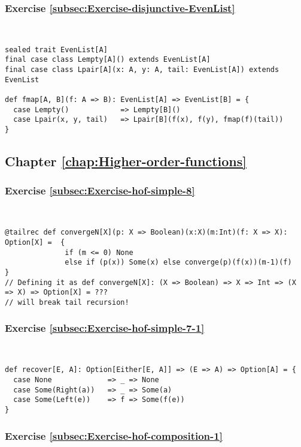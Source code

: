 \subsubsection*{Exercise \ref{subsec:Exercise-disjunctive-EvenList}}

~
\begin{lstlisting}
sealed trait EvenList[A]
final case class Lempty[A]() extends EvenList[A]
final case class Lpair[A](x: A, y: A, tail: EvenList[A]) extends EvenList

def fmap[A, B](f: A => B): EvenList[A] => EvenList[B] = {
  case Lempty()            => Lempty[B]()
  case Lpair(x, y, tail)   => Lpair[B](f(x), f(y), fmap(f)(tail))
}
\end{lstlisting}


\subsection*{Chapter \ref{chap:Higher-order-functions}}

\subsubsection*{Exercise \ref{subsec:Exercise-hof-simple-8}}

~
\begin{lstlisting}
@tailrec def convergeN[X](p: X => Boolean)(x:X)(m:Int)(f: X => X): Option[X] =  {
              if (m <= 0) None
              else if (p(x)) Some(x) else converge(p)(f(x))(m-1)(f)             }
// Defining it as def convergeN[X]: (X => Boolean) => X => Int => (X => X) => Option[X] = ???
// will break tail recursion!
\end{lstlisting}


\subsubsection*{Exercise \ref{subsec:Exercise-hof-simple-7-1}}

~
\begin{lstlisting}
def recover[E, A]: Option[Either[E, A]] => (E => A) => Option[A] = {
  case None             => _ => None
  case Some(Right(a))   => _ => Some(a)
  case Some(Left(e))    => f => Some(f(e))
}
\end{lstlisting}


\subsubsection*{Exercise \ref{subsec:Exercise-hof-composition-1}}

